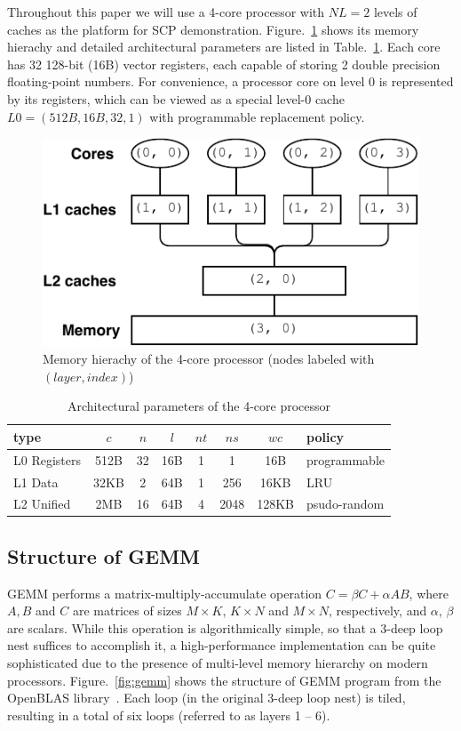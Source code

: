 Throughout this paper we will use a 4-core processor with
$NL=2$ levels of caches as the platform for SCP demonstration.
Figure.~\ref{fig:hierachy} shows its memory hierachy and
detailed architectural parameters are listed in Table.~\ref{tab:cluster}.
Each core has 32 128-bit (16B) vector registers,
each capable of storing 2 double precision floating-point numbers.
For convenience, a processor core on level 0
is represented by its registers, which can be viewed as a special
level-0 cache $L0 = (512B, 16B, 32, 1)$ with programmable replacement policy.

\begin{figure}
  \centering
  \includegraphics[width=.45\textwidth]{figures/cluster-new}
  \caption{Memory hierachy of the 4-core processor
    (nodes labeled with $(layer,index)$)}
  \label{fig:hierachy}
\end{figure}

\begin{table}
  \centering
  \caption{Architectural parameters of the 4-core processor}
  \label{tab:cluster}
  \begin{tabular}{lccccccl}
    \toprule
    type & $c$ & $n$ & $l$ & $nt$ & $ns$ & $wc$ & policy \\
    \midrule
    L0 Registers  & 512B & 32 & 16B & 1 & 1 & 16B & programmable \\
    L1 Data    & 32KB & 2  & 64B & 1 & 256 & 16KB & LRU \\
    L2 Unified & 2MB  & 16 & 64B & 4 & 2048 & 128KB & psudo-random \\
    \bottomrule
  \end{tabular}
\end{table}

\subsection{Structure of GEMM}\label{subsec:gemm}

GEMM performs a matrix-multiply-accumulate operation $C = \beta C + \alpha A B$,
where $A, B$ and $C$ are matrices of sizes
$M \times K$, $K \times N$ and $M \times N$, respectively,
and $\alpha$, $\beta$ are scalars.
While this operation is algorithmically simple,
so that a 3-deep loop nest suffices to accomplish it,
a high-performance implementation can be quite
sophisticated due to the presence of multi-level memory
hierarchy on modern processors.
Figure.~\ref{fig:gemm} shows the structure of GEMM program from
the OpenBLAS library~\cite{openblas}.
Each loop (in the original 3-deep loop nest) is tiled,
resulting in a total of six loops (referred to as layers 1 -- 6).

